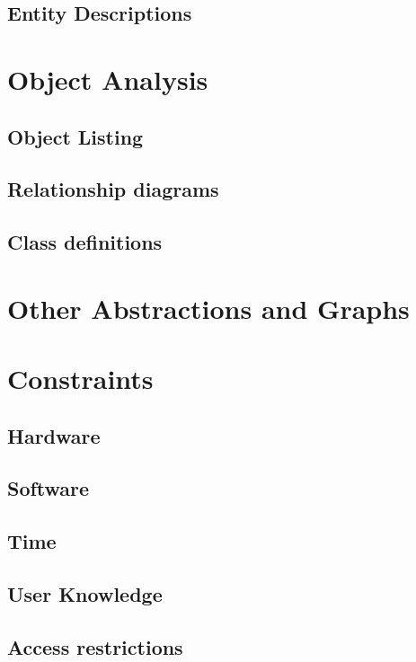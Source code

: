 \subsection{Entity Descriptions}

\section{Object Analysis}

\subsection{Object Listing}

\subsection{Relationship diagrams}

\subsection{Class definitions}

\section{Other Abstractions and Graphs}

\section{Constraints}

\subsection{Hardware}

\subsection{Software}

\subsection{Time}

\subsection{User Knowledge}

\subsection{Access restrictions}

